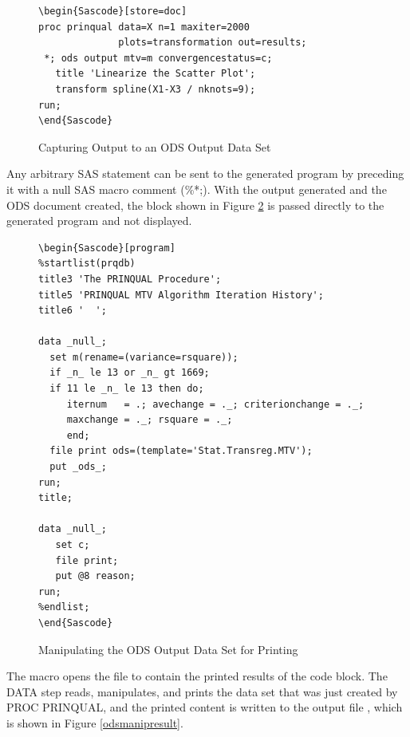 \documentclass[article,oneside]{memoir}
\begin{document}
\begin{figure}[H]
\begin{snugshade}
\begin{verbatim}
\begin{Sascode}[store=doc]
proc prinqual data=X n=1 maxiter=2000
              plots=transformation out=results;
 *; ods output mtv=m convergencestatus=c;
   title 'Linearize the Scatter Plot';
   transform spline(X1-X3 / nknots=9);
run;
\end{Sascode}
\end{verbatim}
\end{snugshade}
\caption{Capturing Output to an ODS Output Data Set}\label{odsdataset}
\end{figure}

  Any arbitrary SAS statement can be sent to the generated program by preceding
  it with a null SAS macro comment (\%*;).
  With the output generated and the ODS document  created,
  the  block shown in Figure \ref{odsmanip} is passed directly
  to the generated program and not displayed.

\begin{figure}[H]
\begin{snugshade}
\begin{verbatim}
\begin{Sascode}[program]
%startlist(prqdb)
title3 'The PRINQUAL Procedure';
title5 'PRINQUAL MTV Algorithm Iteration History';
title6 '  ';

data _null_;
  set m(rename=(variance=rsquare));
  if _n_ le 13 or _n_ gt 1669;
  if 11 le _n_ le 13 then do;
     iternum   = .; avechange = ._; criterionchange = ._;
     maxchange = ._; rsquare = ._;
     end;
  file print ods=(template='Stat.Transreg.MTV');
  put _ods_;
run;
title;

data _null_;
   set c;
   file print;
   put @8 reason;
run;
%endlist;
\end{Sascode}
\end{verbatim}
\end{snugshade}
\caption{Manipulating the ODS Output Data Set for Printing}\label{odsmanip}
\end{figure}

  The  macro opens the file 
   to contain the printed results of the code block.
  The DATA step reads, manipulates, and prints the data set 
  that was just created by PROC PRINQUAL, and the printed content is written to the
  output file , which is shown in Figure \ref{odsmanipresult}.
\end{document}
